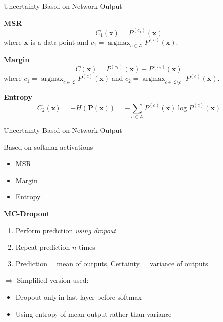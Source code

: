 \documentclass[xcolor={usenames,dvipsnames}]{beamer}
\DeclareMathOperator{\argmax}{argmax}
\begin{document}
\begin{frame}{Uncertainty Based on Network Output}
	\vspace{-20pt}
	\begin{block}{\textbf{\gls{MSR}}}   
	\begin{equation*}
	\label{eq:net_msr}
	C_1(\mathbf{x})=P^{(c_1)}(\mathbf{x})
	\end{equation*}
	where $\mathbf{x}$ is a data point and $c_1=\argmax_{c\in\mathcal{L}}P^{(c)}(\mathbf{x})$.
	\end{block}
	
	\begin{block}{\textbf{Margin}}   
	\begin{equation*}
	\label{eq:net_margin}
	C(\mathbf{x})=P^{(c_1)}(\mathbf{x})-P^{(c_2)}(\mathbf{x})
	\end{equation*}
	where $c_1=\argmax_{c\in\mathcal{L}}P^{(c)}(\mathbf{x})$ and $c_2=\argmax_{c\in\mathcal{L}\setminus c_1}P^{(c)}(\mathbf{x})$.
	\end{block}
	\begin{block}{\textbf{Entropy}}   
	\begin{equation*}
	\label{eq:net_entropy}
	C_2(\mathbf{x}) = -H(\mathbf{P(\mathbf{x})}) = -\sum_{c\in \mathcal{L}}^{}P^{(c)}(\mathbf{x})\log P^{(c)}(\mathbf{x})
	\end{equation*}
	\end{block}
\end{frame}


\begin{frame}{Uncertainty Based on Network Output}
\begin{block}{Based on softmax activations}
	\begin{itemize}
		\item \gls{MSR}
		\item Margin
		\item Entropy
	\end{itemize}	
\end{block}

\begin{block}{\textbf{\gls{MC-Dropout}}}
	\begin{enumerate}
		\item Perform prediction \textit{using dropout}
		\item Repeat prediction $n$ times
		\item Prediction = mean of outputs, Certainty = variance of outputs
	\end{enumerate}
	$\Rightarrow$ Simplified version used:
	\begin{itemize}
		\item Dropout only in last layer before softmax
		\item Using entropy of mean output rather than variance
	\end{itemize}
\end{block}
\end{frame}
\end{document}
